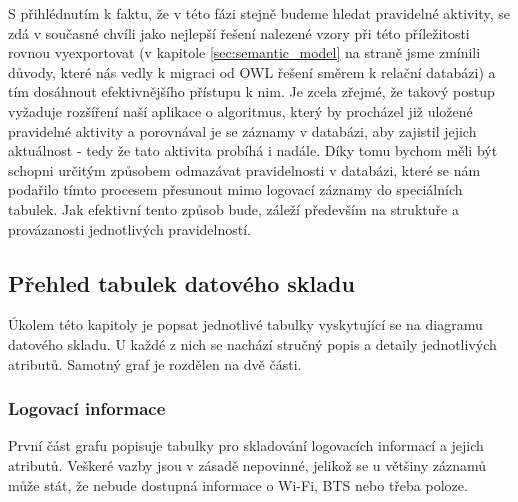 \documentclass[thesis=M,czech]{FITthesis}[2012/06/26]
\begin{document}
S přihlédnutím k faktu, že v této fázi stejně budeme hledat pravidelné aktivity, se zdá v současné chvíli jako nejlepší řešení nalezené vzory při této příležitosti rovnou vyexportovat (v kapitole \ref{sec:semantic_model} na straně \pageref{sec:semantic_model} jsme zmínili důvody, které nás vedly k migraci od OWL řešení směrem k relační databázi) a tím dosáhnout efektivnějšího přístupu k nim. Je zcela zřejmé, že takový postup vyžaduje rozšíření naší aplikace o algoritmus, který by procházel již uložené pravidelné aktivity a porovnával je se záznamy v databázi, aby zajistil jejich aktuálnost - tedy že tato aktivita probíhá i nadále. Díky tomu bychom měli být schopni určitým způsobem odmazávat pravidelnosti v databázi, které se nám podařilo tímto procesem přesunout mimo logovací záznamy do speciálních tabulek. Jak efektivní tento způsob bude, záleží především na struktuře a provázanosti jednotlivých pravidelností.

\subsection{Přehled tabulek datového skladu}
Úkolem této kapitoly je popsat jednotlivé tabulky vyskytující se na diagramu datového skladu. U každé z nich se nachází stručný popis a detaily jednotlivých atributů. Samotný graf je rozdělen na dvě části.

\subsubsection*{Logovací informace}
První část grafu popisuje tabulky pro skladování logovacích informací a jejich atributů. Veškeré vazby jsou v zásadě nepovinné, jelikož se u většiny záznamů může stát, že nebude dostupná informace o Wi-Fi, BTS nebo třeba poloze.
\end{document}
